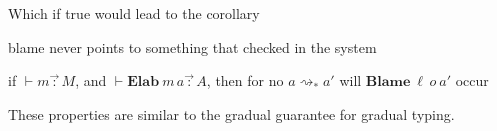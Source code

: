 Which if true would lead to the corollary
\begin{conjecture}
blame never points to something that checked in the \bidir{} system
 
if $\vdash m\overrightarrow{\,:\,}M$, and $\vdash\textbf{Elab}\ m\,a\overrightarrow{\,:\,}A$, then for no $a\rightsquigarrow_{*}a'$ will $\textbf{Blame}\:\ell\,o\:a'$ occur
 
\end{conjecture}
 
These properties are similar to the gradual guarantee\cite{siek_et_al:LIPIcs:2015:5031} for gradual typing.